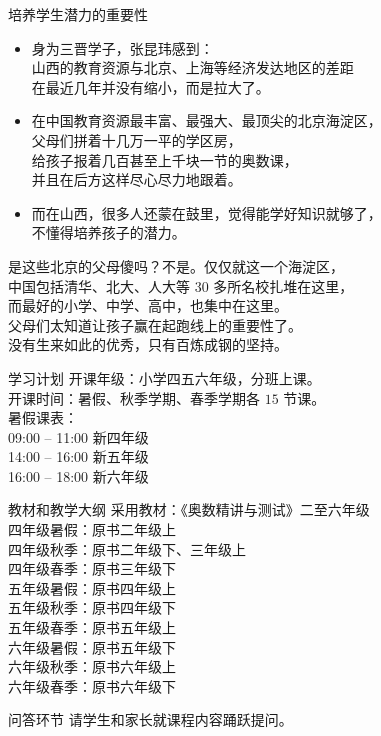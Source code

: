 \documentclass{beamer}
\begin{document}
\begin{frame}{培养学生潜力的重要性}
\begin{itemize}
\item 身为三晋学子，张昆玮感到：\\
山西的教育资源与北京、上海等经济发达地区的差距\\
在最近几年并没有缩小，而是拉大了。
\item 在中国教育资源最丰富、最强大、最顶尖的北京海淀区，\\
父母们拼着十几万一平的学区房，\\
给孩子报着几百甚至上千块一节的奥数课，\\
并且在后方这样尽心尽力地跟着。
\item 而在山西，很多人还蒙在鼓里，觉得能学好知识就够了，\\
不懂得培养孩子的潜力。
\end{itemize}
\bigbreak
是这些北京的父母傻吗？不是。仅仅就这一个海淀区，\\
中国包括清华、北大、人大等 30 多所名校扎堆在这里，\\
而最好的小学、中学、高中，也集中在这里。\\
父母们太知道让孩子赢在起跑线上的重要性了。\\
没有生来如此的优秀，只有百炼成钢的坚持。
\end{frame}

\begin{frame}{学习计划}
开课年级：小学四五六年级，分班上课。\\
开课时间：暑假、秋季学期、春季学期各 $15$ 节课。\\
\bigbreak
暑假课表：\\
09:00 -- 11:00 新四年级\\
14:00 -- 16:00 新五年级\\
16:00 -- 18:00 新六年级\\
\end{frame}

\begin{frame}{教材和教学大纲}
采用教材：《奥数精讲与测试》二至六年级\\
\bigbreak
四年级暑假：原书二年级上\\
四年级秋季：原书二年级下、三年级上\\
四年级春季：原书三年级下\\
五年级暑假：原书四年级上\\
五年级秋季：原书四年级下\\
五年级春季：原书五年级上\\
六年级暑假：原书五年级下\\
六年级秋季：原书六年级上\\
六年级春季：原书六年级下\\
\end{frame}

\begin{frame}{问答环节}
请学生和家长就课程内容踊跃提问。
\end{frame}
\end{document}
